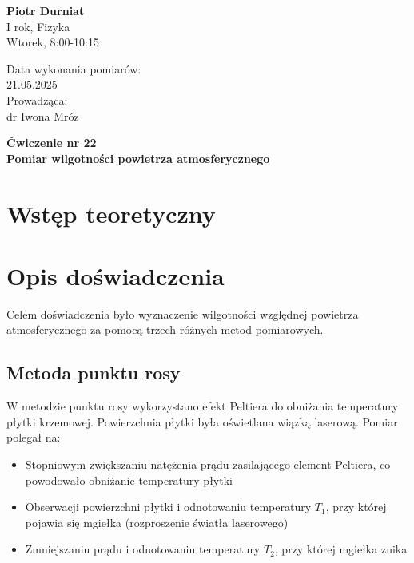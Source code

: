 \documentclass[a4paper,12pt]{article}
\begin{document}
\noindent
\begin{minipage}{0.5\textwidth}
    \raggedright
    \textbf{Piotr Durniat} \\
    I rok, Fizyka \\
    Wtorek, 8:00-10:15 \\
    \vspace{0.5cm}
    \vspace{0.5cm}
\end{minipage}%
\begin{minipage}{0.5\textwidth}
    \raggedleft
    Data wykonania pomiarów: \\
    21.05.2025 \\
    \vspace{0.5cm}
    Prowadząca: \\
    dr Iwona Mróz
\end{minipage}

\vspace{2cm}
\begin{center}
    \LARGE \textbf{Ćwiczenie nr 22} \\[0.5cm]
    \Large \textbf{Pomiar wilgotności powietrza atmosferycznego}
\end{center}

\vspace{1cm} %
\noindent

\tableofcontents
\newpage

\section{Wstęp teoretyczny}

\section{Opis doświadczenia}

Celem doświadczenia było wyznaczenie wilgotności względnej powietrza atmosferycznego za pomocą trzech różnych metod pomiarowych.

\subsection{Metoda punktu rosy}

W metodzie punktu rosy wykorzystano efekt Peltiera do obniżania temperatury płytki krzemowej. Powierzchnia płytki była oświetlana wiązką laserową. Pomiar polegał na:
\begin{itemize}
    \item Stopniowym zwiększaniu natężenia prądu zasilającego element Peltiera, co powodowało obniżanie temperatury płytki
    \item Obserwacji powierzchni płytki i odnotowaniu temperatury $T_1$, przy której pojawia się mgiełka (rozproszenie światła laserowego)
    \item Zmniejszaniu prądu i odnotowaniu temperatury $T_2$, przy której mgiełka znika
\end{itemize}
\end{document}

